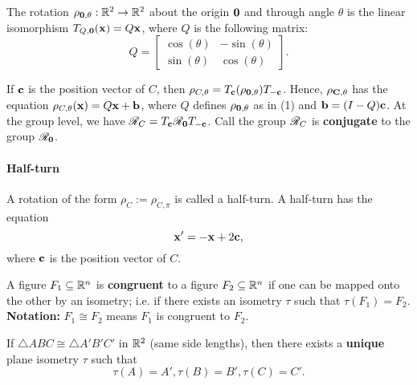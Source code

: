 \begin{theorem}
    \begin{statements}{}
        \item The rotation \(\rho_{\mathbf{0}, \theta}: \mathbb{R}^2 \to \mathbb{R}^2\) about the origin \(\mathbf{0}\) and through angle \(\theta\) is the linear isomorphism \(T_{Q, \mathbf{0}} (\mathbf{x}) = Q\mathbf{x}\), where \(Q\) is the following matrix:
        \[Q = \begin{bmatrix}
                \cos(\theta) & -\sin(\theta) \\
                \sin(\theta) & \cos(\theta)
            \end{bmatrix}.\]
        \item If \(\mathbf{c}\) is the position vector of \(C\), then \(\rho_{C, \theta} = T_{\mathbf{c}}(\rho_{\mathbf{0}, \theta})T_{-\mathbf{c}}\). Hence, \(\rho_{\mathbf{C}, \theta}\) has the equation \(\rho_{C, \theta}(\mathbf{x}) = Q\mathbf{x} + \mathbf{b}\), where \(Q\) defines \(\rho_{\mathbf{0}, \theta}\) as in (1) and \(\mathbf{b} = (I - Q)\mathbf{c}\). At the group level, we have \(\mathscr{R}_C = T_{\mathbf{c}}\mathscr{R}_{\mathbf{0}}T_{-\mathbf{c}}\). Call the group \(\mathscr{R}_C\) is \textbf{conjugate} to the group \(\mathscr{R}_{\mathbf{0}}\).
    \end{statements}
\end{theorem}

\paragraph{Half-turn}
A rotation of the form \(\rho_C := \rho_{C, \pi}\) is called a half-turn. A half-turn has the equation
\[\mathbf{x}' = -\mathbf{x} + 2\mathbf{c}, \]
where \(\mathbf{c}\) is the position vector of \(C\).

\begin{definition}
    A figure \(F_1 \subseteq \mathbb{R}^n\) is \textbf{congruent} to a figure \(F_2 \subseteq \mathbb{R}^n\) if one can be mapped onto the other by an isometry; i.e. if there exists an isometry \(\tau\) such that \(\tau(F_1) = F_2\).
    \textbf{Notation:} \(F_1 \cong F_2\) means \(F_1\) is congruent to \(F_2\).
\end{definition}

\begin{theorem}
    If \(\triangle ABC \cong \triangle A'B'C'\) in \(\mathbb{R}^2\) (same side lengths), then there exists a \textbf{unique} plane isometry \(\tau\) such that
    \[\tau(A) = A', \tau(B) = B', \tau(C) = C'.\]
\end{theorem}

\newpage